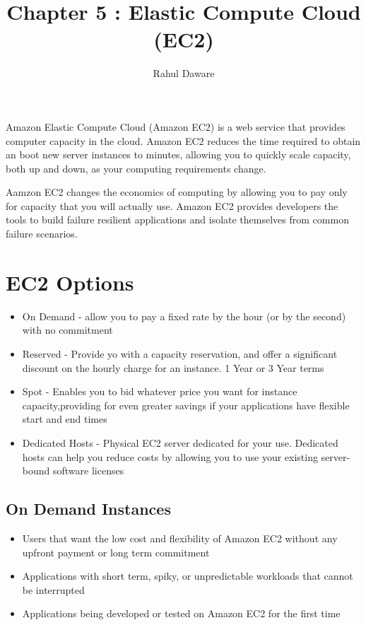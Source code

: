 \documentclass{article}
\author{Rahul Daware}
\begin{document}
\title{Chapter 5 : Elastic Compute Cloud (EC2)}
\maketitle
\newpage
\tableofcontents
\newpage

Amazon Elastic Compute Cloud (Amazon EC2) is a web service that provides computer capacity in the cloud. Amazon EC2 reduces the time required to obtain an boot new server instances to minutes, allowing you to quickly scale capacity, both up and down, as your computing requirements change.

Aamzon EC2 changes the economics of computing by allowing you to pay only for capacity that you will actually use. Amazon EC2 provides developers the tools to build failure resilient applications and isolate themselves from common failure scenarios.

\section{EC2 Options}
\begin{itemize}
\item
On Demand - allow you to pay a fixed rate by the hour (or by the second) with no commitment

\item
Reserved - Provide yo with a capacity reservation, and offer a significant discount on the hourly charge for an instance. 1 Year or 3 Year terms

\item
Spot - Enables you to bid whatever price you want for instance capacity,providing for even greater savings if your applications have flexible start and end times

\item
Dedicated Hosts - Physical EC2 server dedicated for your use. Dedicated hosts can help you reduce costs by allowing you to use your existing server-bound software licenses
\end{itemize}

\subsection{On Demand Instances}
\begin{itemize}
\item
Users that want the low cost and flexibility of Amazon EC2 without any upfront payment or long term commitment

\item
Applications with short term, spiky, or unpredictable workloads that cannot be interrupted

\item
Applications being developed or tested on Amazon EC2 for the first time
\end{itemize}
\end{document}
